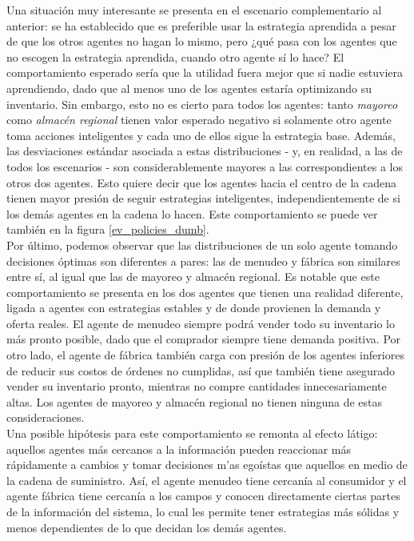 Una situaci\'on muy interesante se presenta en el escenario complementario al anterior: se ha establecido que es preferible usar la estrategia aprendida a pesar de que los otros agentes no hagan lo mismo, pero ¿qu\'e pasa con los agentes que no escogen la estrategia aprendida, cuando otro agente s\'i lo hace? El comportamiento esperado ser\'ia que la utilidad fuera mejor que si nadie estuviera aprendiendo, dado que al menos uno de los agentes estar\'ia optimizando su inventario. Sin embargo, esto no es cierto para todos los agentes: tanto \textit{mayoreo} como \textit{almac\'en regional} tienen valor esperado negativo si solamente otro agente toma acciones inteligentes y cada uno de ellos sigue la estrategia base. Adem\'as, las desviaciones est\'andar asociada a estas distribuciones - y, en realidad, a las de todos los escenarios - son considerablemente mayores a las correspondientes a los otros dos agentes. Esto quiere decir que los agentes hacia el centro de la cadena tienen mayor presi\'on de seguir estrategias inteligentes, independientemente de si los dem\'as agentes en la cadena lo hacen. Este comportamiento se puede ver tambi\'en en la figura \ref{ev_policies_dumb}.\\

Por \'ultimo, podemos observar que las distribuciones de un solo agente tomando decisiones \'optimas son diferentes a pares: las de menudeo y f\'abrica son similares entre s\'i, al igual que las de mayoreo y almac\'en regional. Es notable que este comportamiento se presenta en los dos agentes que tienen una realidad diferente, ligada a agentes con estrategias estables y de donde provienen la demanda y oferta reales. El agente de menudeo siempre podr\'a vender todo su inventario lo m\'as pronto posible, dado que el comprador siempre tiene demanda positiva. Por otro lado, el agente de f\'abrica tambi\'en carga con presi\'on de los agentes inferiores de reducir sus costos de \'ordenes no cumplidas, as\'i que tambi\'en tiene asegurado vender su inventario pronto, mientras no compre cantidades innecesariamente altas. Los agentes de mayoreo y almac\'en regional no tienen ninguna de estas consideraciones.\\

Una posible hip\'otesis para este comportamiento se remonta al efecto l\'atigo: aquellos agentes m\'as cercanos a la informaci\'on pueden reaccionar m\'as r\'apidamente a cambios y tomar decisiones m'as ego\'istas que aquellos en medio de la cadena de suministro. As\'i, el agente menudeo tiene cercan\'ia al consumidor y el agente f\'abrica tiene cercan\'ia a los campos y conocen directamente ciertas partes de la informaci\'on del sistema, lo cual les permite tener estrategias m\'as s\'olidas y menos dependientes de lo que decidan los dem\'as agentes.\\

